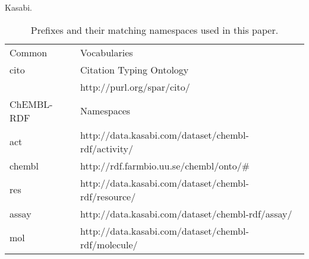 \documentclass[sw]{iosart2c}
\begin{document}
Kasabi.


\begin{table*}
\caption{Prefixes and their matching namespaces used in this paper.} \label{namespaces}
\begin{tabular}{ll}
\hline
Common & Vocabularies \\
cito & Citation Typing Ontology~\cite{ont:cito} \\
     & http://purl.org/spar/cito/ \\

\hline
ChEMBL-RDF & Namespaces\\
act    & http://data.kasabi.com/dataset/chembl-rdf/activity/ \\
chembl & http://rdf.farmbio.uu.se/chembl/onto/\# \\
res    & http://data.kasabi.com/dataset/chembl-rdf/resource/ \\
assay  & http://data.kasabi.com/dataset/chembl-rdf/assay/ \\
mol    & http://data.kasabi.com/dataset/chembl-rdf/molecule/ \\
\hline
\end{tabular}
\end{table*}


%
%
%

\end{document}
